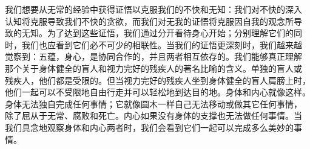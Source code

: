 我们想要从无常的经验中获得证悟以克服我们的不快和无知：我们对不快的深入
认知将克服导致我们不快的贪欲，而我们对无我的证悟将克服因自我的观念所导
致的无知。为了达到这些证悟，我们通过分开看待身心开始；分别理解它们的同
时，我们也应看到它们必不可少的相联性。当我们的证悟更深刻时，我们越来越
觉察到：五蕴，身心，是协同合作的，并且\1两者相互依存的。我们能够真正理解
那个关于身体健全的盲人和视力完好的残疾人的著名比喻的含义。单独的盲人或
残疾人，他们都是受限的。但当视力完好的残疾人坐到身体健全的盲人肩膀上时，
他们一起可以不受限地自由行走并可以轻松地到达目的地。身体和内心就像这样。
身体无法独自完成任何事情；它就像圆木一样自己无法移动或做其它任何事情，
除了屈从于无常、腐败和死亡。内心如果没有身体的支撑也无法做任何事情。当
我们具念地观察身体和内心两者时，我们会看到它们一起可以完成多么美妙的事
情。

\endchapter

\byebye
